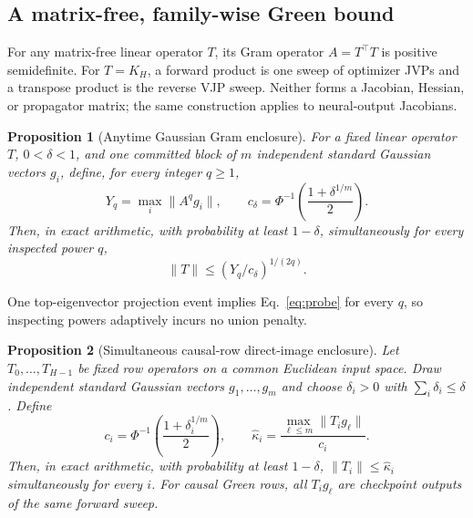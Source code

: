 \documentclass{article}
\newtheorem{proposition}{Proposition}
\begin{document}
\subsection{A matrix-free, family-wise Green bound}

For any matrix-free linear operator $T$, its Gram operator $A=T^\top T$ is
positive semidefinite.  For $T=K_H$, a forward product is one sweep of
optimizer JVPs and a transpose product is the reverse VJP sweep.  Neither forms
a Jacobian, Hessian, or propagator matrix; the same construction applies to
neural-output Jacobians.

\begin{proposition}[Anytime Gaussian Gram enclosure]
\label{prop:probe}
For a fixed linear operator $T$, $0<\delta<1$, and one committed block of $m$
independent standard Gaussian vectors $g_i$, define, for every integer $q\ge1$,
\begin{equation}
 Y_q=\max_i\lVert A^qg_i\rVert,
 \qquad
 c_\delta=\Phi^{-1}\!\left(\frac{1+\delta^{1/m}}2\right).
 \label{eq:cdelta}
\end{equation}
Then, in exact arithmetic, with probability at least $1-\delta$,
\emph{simultaneously for every inspected power} $q$,
\begin{equation}
 \lVert T\rVert\le\left(Y_q/c_\delta\right)^{1/(2q)}.
 \label{eq:probe}
\end{equation}
\end{proposition}

One top-eigenvector projection event implies Eq.~\eqref{eq:probe} for every
$q$, so inspecting powers adaptively incurs no union penalty.

\begin{proposition}[Simultaneous causal-row direct-image enclosure]
\label{prop:row-probe}
Let $T_0,\ldots,T_{H-1}$ be fixed row operators on a common Euclidean input
space.  Draw independent standard Gaussian vectors $g_1,\ldots,g_m$ and choose
$\delta_i>0$ with $\sum_i\delta_i\le\delta$.  Define
\begin{equation}
 c_i=\Phi^{-1}\!\left(\frac{1+\delta_i^{1/m}}2\right),\qquad
 \widehat\kappa_i=\frac{\max_{\ell\le m}\|T_i g_\ell\|}{c_i}.
 \label{eq:causal-row-probe}
\end{equation}
Then, in exact arithmetic, with probability at least $1-\delta$,
$\|T_i\|\le\widehat\kappa_i$ simultaneously for every $i$.
For causal Green rows, all $T_i g_\ell$ are checkpoint outputs of the same
forward sweep.
\end{proposition}
\end{document}
